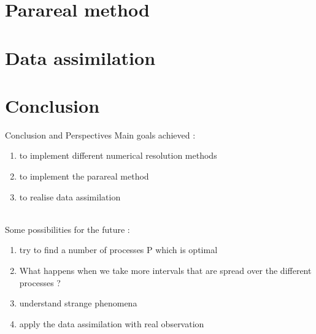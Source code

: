 \documentclass[10pt,xcolor={table,dvipsnames},t]{beamer}
\begin{document}
	\section{Parareal method}

	
	
	\section{Data assimilation}
	
	
	
	\section{Conclusion}
	
	\begin{frame}{Conclusion and Perspectives}
		Main goals achieved :
		\begin{enumerate}[\textbullet]
			\item to implement different numerical resolution methods
			\item to implement the parareal method
			\item to realise data assimilation
		\end{enumerate} \; \\
	
		Some possibilities for the future :
		\begin{enumerate}[\textbullet]
			\item try to find a number of processes P which is optimal
			\item What happens when we take more intervals that are spread over the different processes ?
			\item understand strange phenomena
			\item apply the data assimilation with real observation 
		\end{enumerate}
	\end{frame}
	
\end{document}
